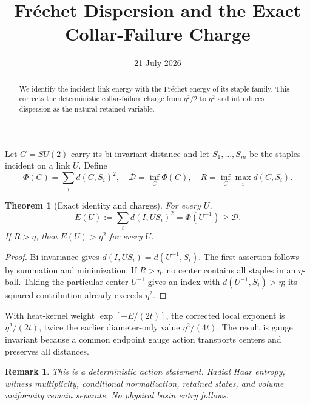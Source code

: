 \documentclass[11pt]{article}\usepackage[margin=1in]{geometry}\usepackage{amsmath,amssymb,amsthm}
\title{Fr\'echet Dispersion and the Exact Collar-Failure Charge}\author{}\date{21 July 2026}
\newtheorem{theorem}{Theorem}\newtheorem{remark}{Remark}
\begin{document}
\maketitle
\begin{abstract}We identify the incident link energy with the Fr\'echet energy of its staple family.  This corrects the deterministic collar-failure charge from $\eta^2/2$ to $\eta^2$ and introduces dispersion as the natural retained variable.\end{abstract}
Let $G=SU(2)$ carry its bi-invariant distance and let $S_1,\dots,S_m$ be the staples incident on a link $U$. Define
\[\Phi(C)=\sum_i d(C,S_i)^2,\quad \mathcal D=\inf_C\Phi(C),\quad R=\inf_C\max_i d(C,S_i).\]
\begin{theorem}[Exact identity and charges]For every $U$,
\[E(U):=\sum_i d(I,US_i)^2=\Phi(U^{-1})\ge\mathcal D.\]
If $R>\eta$, then $E(U)>\eta^2$ for every $U$.\end{theorem}
\begin{proof}Bi-invariance gives $d(I,US_i)=d(U^{-1},S_i)$.  The first assertion follows by summation and minimization. If $R>\eta$, no center contains all staples in an $\eta$-ball. Taking the particular center $U^{-1}$ gives an index with $d(U^{-1},S_i)>\eta$; its squared contribution already exceeds $\eta^2$.\end{proof}
With heat-kernel weight $\exp[-E/(2t)]$, the corrected local exponent is $\eta^2/(2t)$, twice the earlier diameter-only value $\eta^2/(4t)$.  The result is gauge invariant because a common endpoint gauge action transports centers and preserves all distances.
\begin{remark}This is a deterministic action statement. Radial Haar entropy, witness multiplicity, conditional normalization, retained states, and volume uniformity remain separate. No physical basin entry follows.\end{remark}
\end{document}
